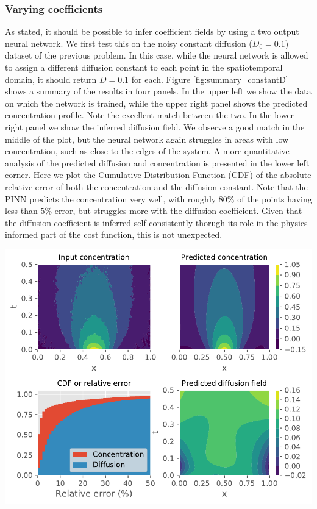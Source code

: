 \documentclass{Dissertate}
\let\origfigure\figure
\let\endorigfigure\endfigure
\renewenvironment{figure}[1][2] {
    \expandafter\origfigure\expandafter[H]
} {
    \endorigfigure
}
\begin{document}
\hypertarget{varying-coefficients}{%
\subsubsection{Varying coefficients}\label{varying-coefficients}}

As stated, it should be possible to infer coefficient fields by using a
two output neural network. We first test this on the noisy constant
diffusion (\(D_0=0.1\)) dataset of the previous problem. In this case,
while the neural network is allowed to assign a different diffusion
constant to each point in the spatiotemporal domain, it should return
\(D=0.1\) for each. Figure \ref{fig:summary_constantD} shows a
summary of the results in four panels. In the upper left we show the
data on which the network is trained, while the upper right panel shows
the predicted concentration profile. Note the excellent match between
the two. In the lower right panel we show the inferred diffusion field.
We observe a good match in the middle of the plot, but the neural
network again struggles in areas with low concentration, such as close
to the edges of the system. A more quantitative analysis of the
predicted diffusion and concentration is presented in the lower left
corner. Here we plot the Cumulative Distribution Function (CDF) of the
absolute relative error of both the concentration and the diffusion
constant. Note that the PINN predicts the concentration very well, with
roughly \(80\%\) of the points having less than \(5\%\) error, but
struggles more with the diffusion coefficient. Given that the diffusion
coefficient is inferred self-consistently thorugh its role in the
physics-informed part of the cost function, this is not unexpected.

\begin{figure}
\hypertarget{fig:summary_constantD}{%
\centering
\includegraphics{source/figures/pdf/summary_constantD_varyingPINN.pdf}
\caption{We show the training data and predicted concentration profile
in the upper left and right panels. The lower right panel shows the
inferred diffusion field while the lower left panel shows the CDF of the
relative error of the diffusion and
concentration.}\label{fig:summary_constantD}
}
\end{figure}
\end{document}
